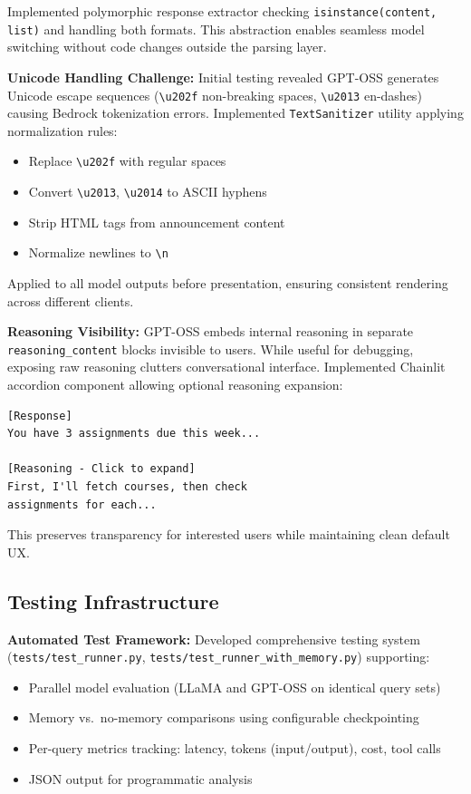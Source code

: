 \documentclass{article}
\begin{document}
Implemented polymorphic response extractor checking \texttt{isinstance(content, list)} and handling both formats. This abstraction enables seamless model switching without code changes outside the parsing layer.

\textbf{Unicode Handling Challenge:} Initial testing revealed GPT-OSS generates Unicode escape sequences (\texttt{\textbackslash u202f} non-breaking spaces, \texttt{\textbackslash u2013} en-dashes) causing Bedrock tokenization errors. Implemented \texttt{TextSanitizer} utility applying normalization rules:

\begin{itemize}
    \item Replace \texttt{\textbackslash u202f} with regular spaces
    \item Convert \texttt{\textbackslash u2013}, \texttt{\textbackslash u2014} to ASCII hyphens
    \item Strip HTML tags from announcement content
    \item Normalize newlines to \texttt{\textbackslash n}
\end{itemize}

Applied to all model outputs before presentation, ensuring consistent rendering across different clients.

\textbf{Reasoning Visibility:} GPT-OSS embeds internal reasoning in separate \texttt{reasoning\_content} blocks invisible to users. While useful for debugging, exposing raw reasoning clutters conversational interface. Implemented Chainlit accordion component allowing optional reasoning expansion:

\begin{verbatim}
[Response]
You have 3 assignments due this week...

[Reasoning - Click to expand]
First, I'll fetch courses, then check 
assignments for each...
\end{verbatim}

This preserves transparency for interested users while maintaining clean default UX.

\subsection{Testing Infrastructure}

\textbf{Automated Test Framework:} Developed comprehensive testing system (\texttt{tests/test\_runner.py}, \texttt{tests/test\_runner\_with\_memory.py}) supporting:

\begin{itemize}
    \item Parallel model evaluation (LLaMA and GPT-OSS on identical query sets)
    \item Memory vs.\ no-memory comparisons using configurable checkpointing
    \item Per-query metrics tracking: latency, tokens (input/output), cost, tool calls
    \item JSON output for programmatic analysis
\end{itemize}
\end{document}
